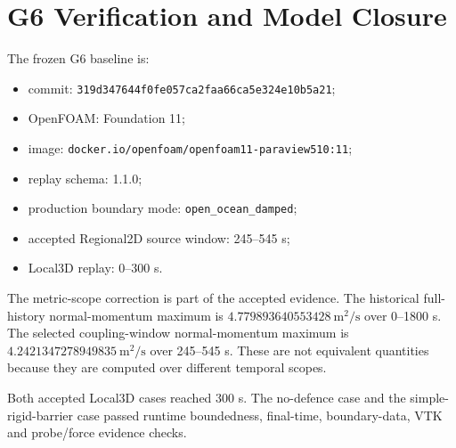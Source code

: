 \section{G6 Verification and Model Closure}

The frozen G6 baseline is:

\begin{itemize}
  \item commit: \texttt{319d347644f0fe057ca2faa66ca5e324e10b5a21};
  \item OpenFOAM: Foundation 11;
  \item image: \texttt{docker.io/openfoam/openfoam11-paraview510:11};
  \item replay schema: 1.1.0;
  \item production boundary mode: \texttt{open\_ocean\_damped};
  \item accepted Regional2D source window: 245--545 s;
  \item Local3D replay: 0--300 s.
\end{itemize}

The metric-scope correction is part of the accepted evidence. The historical full-history normal-momentum maximum is \(4.779893640553428~\si{\metre\squared\per\second}\) over 0--1800 s. The selected coupling-window normal-momentum maximum is \(4.2421347278949835~\si{\metre\squared\per\second}\) over 245--545 s. These are not equivalent quantities because they are computed over different temporal scopes.

Both accepted Local3D cases reached 300 s. The no-defence case and the simple-rigid-barrier case passed runtime boundedness, final-time, boundary-data, VTK and probe/force evidence checks.
